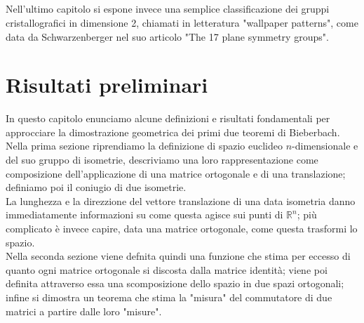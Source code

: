 \documentclass[a4paper,11pt,openright,twoside	]{book}
\begin{document}
\paragraph{}
Nell'ultimo capitolo si espone invece una semplice classificazione dei gruppi cristallografici in dimensione 2, chiamati in letteratura "wallpaper patterns", come data da Schwarzenberger nel suo articolo "The 17 plane symmetry groups". 


\chapter{Risultati preliminari}
In questo capitolo enunciamo alcune definizioni e risultati fondamentali per approcciare la dimostrazione geometrica dei primi due teoremi di Bieberbach.  \\

Nella prima sezione riprendiamo la definizione di spazio euclideo $n$-dimensionale e del suo gruppo di isometrie, descriviamo una loro rappresentazione come composizione dell'applicazione di una matrice ortogonale e di una translazione; definiamo poi il coniugio di due isometrie. \\
La lunghezza e la direzzione del vettore translazione di una data isometria danno immediatamente informazioni su come questa agisce sui punti di $\mathbb{R}^n$; più complicato è invece capire, data una matrice ortogonale, come questa trasformi lo spazio. \\
Nella seconda sezione viene defnita quindi una funzione che stima per eccesso di quanto ogni matrice ortogonale si discosta dalla matrice identità; viene poi definita attraverso essa una scomposizione dello spazio in due spazi ortogonali; infine si dimostra un teorema che stima la "misura" del commutatore di due matrici a partire dalle loro "misure".  
\end{document}
